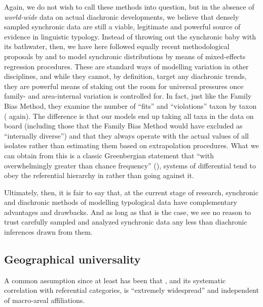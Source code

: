 \documentclass[output=paper]{langscibook}
\begin{document}
Again, we do not wish to call these methods into question, but in the absence of \textit{world-wide} data on actual diachronic developments, we believe that densely sampled synchronic data are still a viable, legitimate and powerful source of evidence in linguistic typology. Instead of throwing out the synchronic baby with its bathwater, then, we have here followed equally recent methodological proposals by \citet{Cysouw2010Dealing} and \citet{Jaeger2011Mixed} to model synchronic distributions by means of mixed-effects regression procedures. These are standard ways of modelling variation in other disciplines, and while they cannot, by definition, target any diachronic trends, they are powerful means of staking out the room for universal pressures once family- and area-internal variation is controlled for. In fact, just like the Family Bias Method, they examine the number of “fits” and “violations” taxon by taxon (\cf {} again). The difference is that our models end up taking all taxa in the data on board (including those that the Family Bias Method would have excluded as “internally diverse”) and that they always operate with the actual values of all isolates rather than estimating them based on extrapolation procedures. What we can obtain from this is a classic Greenbergian statement that “with overwhelmingly greater than chance frequency” (\eg \citealt[79]{Greenberg1966Some}), systems of differential  tend to obey the referential hierarchy in  rather than going against it.

Ultimately, then, it is fair to say that, at the current stage of research, synchronic and diachronic methods of modelling typological data have complementary advantages and drawbacks. And as long as that is the case, we see no reason to trust carefully sampled and analyzed synchronic data any less than diachronic inferences drawn from them.

\subsection{Geographical universality}
\label{18-sc-subsec:4-2}

A common assumption since at least \citet{Bossong1985Differentielle} has been that , and its systematic correlation with referential categories, is “extremely widespread” \citep[439]{Aissen2003Differential} and independent of macro-areal affiliations. 
\end{document}

